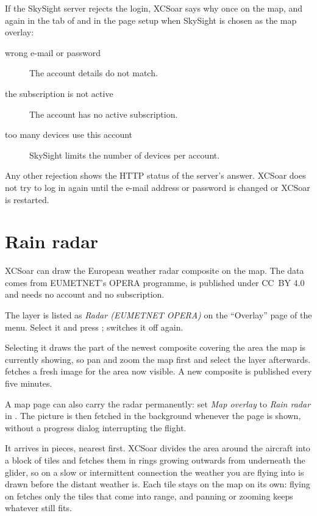 If the SkySight server rejects the login, XCSoar says why once on the
map, and again in the  tab of
 and in the page setup
when SkySight is chosen as the map overlay:
\begin{description}
\item[wrong e-mail or password] The account details do not match.
\item[the subscription is not active] The account has no active
  subscription.
\item[too many devices use this account] SkySight limits the number
  of devices per account.
\end{description}
Any other rejection shows the HTTP status of the server's answer.
XCSoar does not try to log in again until the e-mail address or
password is changed or XCSoar is restarted.

\section{Rain radar}\label{sec:rain-radar}

XCSoar can draw the European weather radar composite on the map.  The
data comes from EUMETNET's OPERA programme, is published under CC~BY
4.0 and needs no account and no subscription.

The layer is listed as \emph{Radar (EUMETNET OPERA)} on the
``Overlay'' page of the
  menu.
Select it and press ;  switches it off
again.

Selecting it draws the part of the newest composite covering the area
the map is currently showing, so pan and zoom the map first and select
the layer afterwards.   fetches a fresh image for the
area now visible.  A new composite is published every five minutes.

A map page can also carry the radar permanently: set \emph{Map
overlay} to \emph{Rain radar} in
.  The picture is then fetched
in the background whenever the page is shown, without a progress
dialog interrupting the flight.

It arrives in pieces, nearest first.  XCSoar divides the area around
the aircraft into a block of tiles and fetches them in rings growing
outwards from underneath the glider, so on a slow or intermittent
connection the weather you are flying into is drawn before the
distant weather is.  Each tile stays on the map on its own: flying on
fetches only the tiles that come into range, and panning or zooming
keeps whatever still fits.

